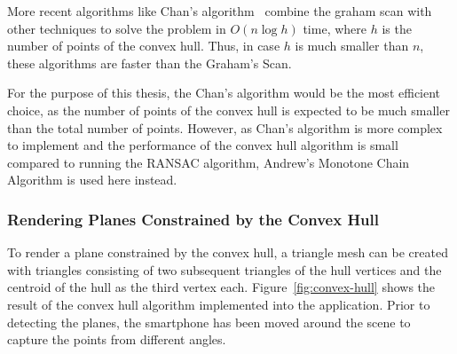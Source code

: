 
More recent algorithms like Chan's algorithm~\cite{chan_optimal_1996} combine the graham scan with other techniques to solve the problem in $O(n \log h)$ time,
where $h$ is the number of points of the convex hull.
Thus, in case $h$ is much smaller than $n$, these algorithms are faster than the Graham's Scan.

For the purpose of this thesis, the Chan's algorithm would be the most efficient choice,
as the number of points of the convex hull is expected to be much smaller than the total number of points.
However, as Chan's algorithm is more complex to implement and the performance of the convex hull algorithm
is small compared to running the RANSAC algorithm, Andrew's Monotone Chain Algorithm is used here instead.



\subsubsection{Rendering Planes Constrained by the Convex Hull}
To render a plane constrained by the convex hull,
a triangle mesh can be created with triangles consisting of two subsequent triangles of the hull vertices and the centroid of the hull as the third vertex each.
Figure~\ref{fig:convex-hull} shows the result of the convex hull algorithm implemented into the application.
Prior to detecting the planes, the smartphone has been moved around the scene to capture the points from different angles.

